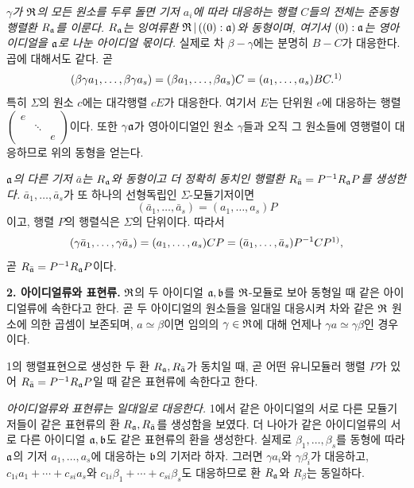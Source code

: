 \emph{\(\gamma\)가 \(\mathfrak{R}\)의 모든 원소를 두루 돌면 기저 \(a_i\)에 따라 대응하는 행렬 \(C\)들의 전체는 준동형 행렬환 \(R_{\mathfrak{a}}\)를 이룬다. \(R_{\mathfrak{a}}\)는 잉여류환 \(\mathfrak{R}\,|\,((0):\mathfrak{a})\)와 동형이며, 여기서 \((0):\mathfrak{a}\)는 영아이디얼을 \(\mathfrak{a}\)로 나눈 아이디얼 몫이다.} 실제로 차 \(\beta-\gamma\)에는 분명히 \(B-C\)가 대응한다. 곱에 대해서도 같다. 곧
\[
(\beta\gamma a_1,\ldots,\beta\gamma a_s)
=(\beta a_1,\ldots,\beta a_s)C
=(a_1,\ldots,a_s)BC.\srcfnmark{1)}
\]
특히 \(\Sigma\)의 원소 \(c\)에는 대각행렬 \(cE\)가 대응한다. 여기서 \(E\)는 단위원 \(e\)에 대응하는 행렬 \((\begin{smallmatrix}e&&\\&\ddots&\\&&e\end{smallmatrix})\)이다. 또한 \(\gamma\mathfrak{a}\)가 영아이디얼인 원소 \(\gamma\)들과 오직 그 원소들에 영행렬이 대응하므로 위의 동형을 얻는다.

\emph{\(\mathfrak{a}\)의 다른 기저 \(\bar a\)는 \(R_{\mathfrak{a}}\)와 동형이고 더 정확히 동치인 행렬환 \(R_{\bar{\mathfrak{a}}}=P^{-1}R_{\mathfrak{a}} P\)를 생성한다.} \(\bar a_1,\ldots,\bar a_s\)가 또 하나의 선형독립인 \(\Sigma\)-모듈기저이면
\[
(\bar a_1,\ldots,\bar a_s)=(a_1,\ldots,a_s)P
\]
이고, 행렬 \(P\)의 행렬식은 \(\Sigma\)의 단위이다. 따라서
\[
(\gamma\bar a_1,\ldots,\gamma\bar a_s)
=(a_1,\ldots,a_s)CP
=(\bar a_1,\ldots,\bar a_s)P^{-1}CP\srcfnmark{1)},
\]
곧 \(R_{\bar{\mathfrak{a}}}=P^{-1}R_{\mathfrak{a}} P\)이다.

\textbf{2. 아이디얼류와 표현류.} \(\mathfrak{R}\)의 두 아이디얼 \(\mathfrak{a},\mathfrak{b}\)를 \(\mathfrak{R}\)-모듈로 보아 동형일 때 같은 아이디얼류에 속한다고 한다. 곧 두 아이디얼의 원소들을 일대일 대응시켜 차와 같은 \(\mathfrak{R}\) 원소에 의한 곱셈이 보존되며, \(a\simeq\beta\)이면 임의의 \(\gamma\in\mathfrak{R}\)에 대해 언제나 \(\gamma a\simeq\gamma\beta\)인 경우이다.

1의 행렬표현으로 생성한 두 환 \(R_{\mathfrak{a}},R_{\bar{\mathfrak{a}}}\)가 동치일 때, 곧 어떤 유니모듈러 행렬 \(P\)가 있어 \(R_{\bar{\mathfrak{a}}}=P^{-1}R_{\mathfrak{a}} P\)일 때 같은 표현류에 속한다고 한다.

\emph{아이디얼류와 표현류는 일대일로 대응한다.} 1에서 같은 아이디얼의 서로 다른 모듈기저들이 같은 표현류의 환 \(R_{\mathfrak{a}},R_{\bar{\mathfrak{a}}}\)를 생성함을 보였다. 더 나아가 같은 아이디얼류의 서로 다른 아이디얼 \(\mathfrak{a},\mathfrak{b}\)도 같은 표현류의 환을 생성한다. 실제로 \(\beta_1,\ldots,\beta_s\)를 동형에 따라 \(\mathfrak{a}\)의 기저 \(a_1,\ldots,a_s\)에 대응하는 \(\mathfrak{b}\)의 기저라 하자. 그러면 \(\gamma a_i\)와 \(\gamma\beta_i\)가 대응하고, \(c_{1i}a_1+\cdots+c_{si}a_s\)와 \(c_{1i}\beta_1+\cdots+c_{si}\beta_s\)도 대응하므로 환 \(R_{\mathfrak{a}}\)와 \(R_\beta\)는 동일하다.

